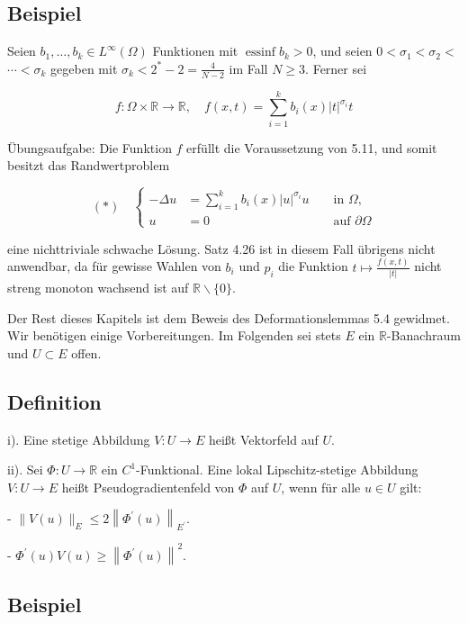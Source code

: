 \documentclass[10pt, letterpaper]{article}
\begin{document}
\subsection*{Beispiel}

Seien $b_{1}, \ldots, b_{k} \in L^{\infty}(\Omega)$ Funktionen mit $\operatorname{essinf} b_{k}>0$, und seien $0<\sigma_{1}<\sigma_{2}<$ $\cdots<\sigma_{k}$ gegeben mit $\sigma_{k}<2^{*}-2=\frac{4}{N-2}$ im Fall $N \geq 3$. Ferner sei

$$
f: \Omega \times \mathbb{R} \rightarrow \mathbb{R}, \quad f(x, t)=\sum_{i=1}^{k} b_{i}(x)|t|^{\sigma_{i}} t
$$

Übungsaufgabe: Die Funktion $f$ erfüllt die Voraussetzung von 5.11, und somit besitzt das Randwertproblem

$$
(*) \quad\left\{\begin{aligned}
-\Delta u & =\sum_{i=1}^{k} b_{i}(x)|u|^{\sigma_{i}} u & & \text { in } \Omega, \\
u & =0 & & \text { auf } \partial \Omega
\end{aligned}\right.
$$

eine nichttriviale schwache Lösung. Satz 4.26 ist in diesem Fall übrigens nicht anwendbar, da für gewisse Wahlen von $b_{i}$ und $p_{i}$ die Funktion $t \mapsto \frac{f(x, t)}{|t|}$ nicht streng monoton wachsend ist auf $\mathbb{R} \backslash\{0\}$.

Der Rest dieses Kapitels ist dem Beweis des Deformationslemmas 5.4 gewidmet. Wir benötigen einige Vorbereitungen. Im Folgenden sei stets $E$ ein $\mathbb{R}$-Banachraum und $U \subset E$ offen.

\subsection*{Definition}

i). Eine stetige Abbildung $V: U \rightarrow E$ heißt Vektorfeld auf $U$.

ii). Sei $\Phi: U \rightarrow \mathbb{R}$ ein $C^{1}$-Funktional. Eine lokal Lipschitz-stetige Abbildung $V: U \rightarrow E$ heißt Pseudogradientenfeld von $\Phi$ auf $U$, wenn für alle $u \in U$ gilt:

- $\|V(u)\|_{E} \leq 2\left\|\Phi^{\prime}(u)\right\|_{E^{\prime}}$.

- $\Phi^{\prime}(u) V(u) \geq\left\|\Phi^{\prime}(u)\right\|^{2}$.

\subsection*{Beispiel}
\end{document}
